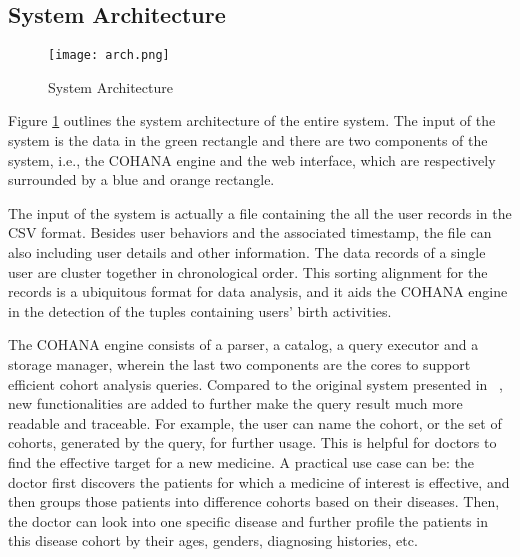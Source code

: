 
\subsection{System Architecture}

\begin{figure}
    \centering
    \texttt{[image: arch.png]}
    \caption{System Architecture}
    \label{fig:sys_arch}
\end{figure}

Figure \ref{fig:sys_arch} outlines the system architecture of the entire system. The input of the system is the data in the green rectangle and there are two components of the system, i.e., the COHANA engine and the web interface, which are respectively surrounded by a blue and orange rectangle. 

The input of the system is actually a file containing the all the user records in the CSV format. 
Besides user behaviors and the associated timestamp, the file can also 
including user details and other information.
The data records of a single user are cluster together in chronological order. 
This sorting alignment for the records is a ubiquitous format for data analysis, and it aids the COHANA engine in the detection of the tuples containing users' birth activities.

The COHANA engine consists of a parser, a catalog, a query executor and a storage manager, wherein the last two components are the cores to support efficient cohort analysis queries. 
Compared to the original system presented in ~\cite{jiang2016cohort}, new functionalities are added to further make the query result much more readable and traceable.
For example, the user can name the cohort, or the set of cohorts, generated by the query, for further usage.
This is helpful for doctors to find the effective target for a new medicine. 
A practical use case can be: the doctor first discovers the patients for which a medicine of interest is effective,
and then groups those patients into difference cohorts based on their diseases. Then, the doctor can look into one specific disease and further profile the patients in this disease cohort by their ages, genders, diagnosing histories, etc.

